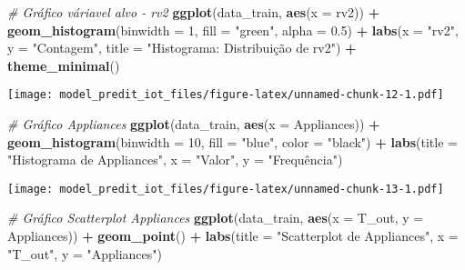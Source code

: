 \documentclass[
]{article}
\newenvironment{Shaded}{\begin{snugshade}}{\end{snugshade}}
\newcommand{\AttributeTok}[1]{\textcolor[rgb]{0.13,0.29,0.53}{#1}}
\newcommand{\CommentTok}[1]{\textcolor[rgb]{0.56,0.35,0.01}{\textit{#1}}}
\newcommand{\DecValTok}[1]{\textcolor[rgb]{0.00,0.00,0.81}{#1}}
\newcommand{\FloatTok}[1]{\textcolor[rgb]{0.00,0.00,0.81}{#1}}
\newcommand{\FunctionTok}[1]{\textcolor[rgb]{0.13,0.29,0.53}{\textbf{#1}}}
\newcommand{\NormalTok}[1]{#1}
\newcommand{\SpecialCharTok}[1]{\textcolor[rgb]{0.81,0.36,0.00}{\textbf{#1}}}
\newcommand{\StringTok}[1]{\textcolor[rgb]{0.31,0.60,0.02}{#1}}
\begin{document}
\begin{Shaded}
\begin{Highlighting}[]
\CommentTok{\# Gráfico váriavel alvo {-} rv2}
\FunctionTok{ggplot}\NormalTok{(data\_train, }\FunctionTok{aes}\NormalTok{(}\AttributeTok{x =}\NormalTok{ rv2)) }\SpecialCharTok{+}
  \FunctionTok{geom\_histogram}\NormalTok{(}\AttributeTok{binwidth =} \DecValTok{1}\NormalTok{, }\AttributeTok{fill =} \StringTok{"green"}\NormalTok{, }\AttributeTok{alpha =} \FloatTok{0.5}\NormalTok{) }\SpecialCharTok{+}
  \FunctionTok{labs}\NormalTok{(}\AttributeTok{x =} \StringTok{"rv2"}\NormalTok{, }\AttributeTok{y =} \StringTok{"Contagem"}\NormalTok{, }\AttributeTok{title =} \StringTok{"Histograma: Distribuição de rv2"}\NormalTok{) }\SpecialCharTok{+}
  \FunctionTok{theme\_minimal}\NormalTok{()}
\end{Highlighting}
\end{Shaded}

\texttt{[image: model\_predit\_iot\_files/figure-latex/unnamed-chunk-12-1.pdf]}

\begin{Shaded}
\begin{Highlighting}[]
\CommentTok{\# Gráfico Appliances}
\FunctionTok{ggplot}\NormalTok{(data\_train, }\FunctionTok{aes}\NormalTok{(}\AttributeTok{x =}\NormalTok{ Appliances)) }\SpecialCharTok{+}
  \FunctionTok{geom\_histogram}\NormalTok{(}\AttributeTok{binwidth =} \DecValTok{10}\NormalTok{, }\AttributeTok{fill =} \StringTok{"blue"}\NormalTok{, }\AttributeTok{color =} \StringTok{"black"}\NormalTok{) }\SpecialCharTok{+}
  \FunctionTok{labs}\NormalTok{(}\AttributeTok{title =} \StringTok{"Histograma de Appliances"}\NormalTok{, }\AttributeTok{x =} \StringTok{"Valor"}\NormalTok{, }\AttributeTok{y =} \StringTok{"Frequência"}\NormalTok{)}
\end{Highlighting}
\end{Shaded}

\texttt{[image: model\_predit\_iot\_files/figure-latex/unnamed-chunk-13-1.pdf]}

\begin{Shaded}
\begin{Highlighting}[]
\CommentTok{\# Gráfico Scatterplot Appliances}
\FunctionTok{ggplot}\NormalTok{(data\_train, }\FunctionTok{aes}\NormalTok{(}\AttributeTok{x =}\NormalTok{ T\_out, }\AttributeTok{y =}\NormalTok{ Appliances)) }\SpecialCharTok{+}
  \FunctionTok{geom\_point}\NormalTok{() }\SpecialCharTok{+}
  \FunctionTok{labs}\NormalTok{(}\AttributeTok{title =} \StringTok{"Scatterplot de Appliances"}\NormalTok{, }\AttributeTok{x =} \StringTok{"T\_out"}\NormalTok{, }\AttributeTok{y =} \StringTok{"Appliances"}\NormalTok{)}
\end{Highlighting}
\end{Shaded}
\end{document}
